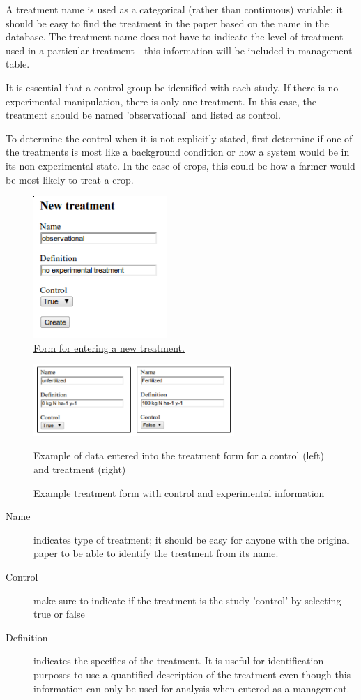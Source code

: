 \documentclass[12pt,english,portrait]{article}
\begin{document}
 A treatment name is used as a categorical (rather than continuous) variable: it should be easy to find the treatment in the paper based on the name in the database.
 The treatment name does not have to indicate the level of treatment used in a particular treatment - this information will be included in management table.
 
 It is essential that a control group be identified with each study.
 If there is no experimental manipulation, there is only one treatment.
 In this case, the treatment should be named 'observational' and listed as control.

 To determine the control when it is not explicitly stated, first determine if one of the treatments is most like a background condition or how a system would be in its non-experimental state.
 In the case of crops, this could be how a farmer would be most likely to treat a crop.

\begin{figure}[hb]
  \includegraphics[width=2in]{figures/treatment_new.png} 
  \caption{\href{http://ebi-forecast.igb.uiuc.edu/bety/treatments/new}{Form for entering a new treatment.} }
  \label{fig:treatment_new}
\end{figure}


\begin{figure}[hb]
  \includegraphics[width=3in]{figures/treatment_examples.pdf} 
  \caption{Example treatment form with control and experimental information}{Example of data entered into the treatment form for a control (left) and treatment (right)}
  \label{fig:treatment_examples}
\end{figure}


\begin{description}
\item[Name] indicates type of treatment; it should be easy for anyone with the original paper to be able to identify the treatment from its name.
\item[Control] make sure to indicate if the treatment is the study 'control' by selecting true or false 
\item[Definition] indicates the specifics of the treatment. 
It is useful for identification purposes to use a quantified description of the treatment even though this information can only be used for analysis when entered as a management. 
\end{description}
\end{document}
